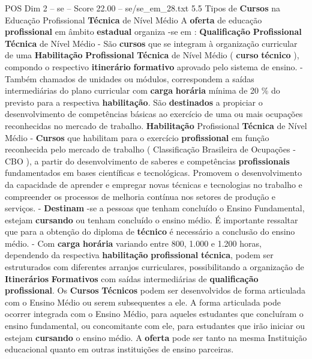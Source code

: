 \begin{textsample}{POS Dim 2 – se – Score 22.00 – se/se\_em\_28.txt}  \label{ex:f2_pos_029}
5.5 Tipos de \textbf{Cursos} na Educação Profissional \textbf{Técnica} de Nível Médio A \textbf{oferta} de educação \textbf{profissional} em âmbito \textbf{estadual} organiza -se em : \textbf{Qualificação} \textbf{Profissional} \textbf{Técnica} de Nível Médio - São \textbf{cursos} que se integram à organização curricular de uma \textbf{Habilitação} \textbf{Profissional} \textbf{Técnica} de Nível Médio ( \textbf{curso} \textbf{técnico} ), compondo o respectivo \textbf{itinerário} \textbf{formativo} aprovado pelo sistema de ensino. - Também chamados de unidades ou módulos, correspondem a saídas intermediárias do plano curricular com \textbf{carga} \textbf{horária} mínima de 20 \% do previsto para a respectiva \textbf{habilitação}.
São \textbf{destinados} a propiciar o desenvolvimento de competências básicas ao exercício de uma ou mais ocupações reconhecidas no mercado de trabalho. \textbf{Habilitação} Profissional \textbf{Técnica} de Nível Médio - \textbf{Cursos} que habilitam para o exercício \textbf{profissional} em função reconhecida pelo mercado de trabalho ( Classificação Brasileira de Ocupações - CBO ), a partir do desenvolvimento de saberes e competências \textbf{profissionais} fundamentados em bases científicas e tecnológicas.
Promovem o desenvolvimento da capacidade de aprender e empregar novas técnicas e tecnologias no trabalho e compreender os processos de melhoria contínua nos setores de produção e serviços. - \textbf{Destinam} -se a pessoas que tenham concluído o Ensino Fundamental, estejam \textbf{cursando} ou tenham concluído o ensino médio.
É importante ressaltar que para a obtenção do diploma de \textbf{técnico} é necessário a conclusão do ensino médio. - Com \textbf{carga} \textbf{horária} variando entre 800, 1.000 e 1.200 horas, dependendo da respectiva \textbf{habilitação} \textbf{profissional} \textbf{técnica}, podem ser estruturados com diferentes arranjos curriculares, possibilitando a organização de \textbf{Itinerários} \textbf{Formativos} com saídas intermediárias de \textbf{qualificação} \textbf{profissional}.
Os \textbf{Cursos} \textbf{Técnicos} podem ser desenvolvidos de forma articulada com o Ensino Médio ou serem subsequentes a ele.
A forma articulada pode ocorrer integrada com o Ensino Médio, para aqueles estudantes que concluíram o ensino fundamental, ou concomitante com ele, para estudantes que irão iniciar ou estejam \textbf{cursando} o ensino médio.
A \textbf{oferta} pode ser tanto na mesma Instituição educacional quanto em outras instituições de ensino parceiras.

\end{textsample}
